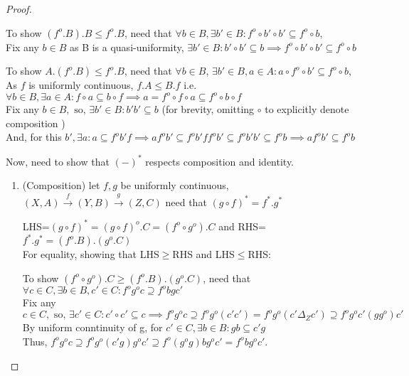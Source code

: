 \documentclass[18pt,a4paper]{article}
\theoremstyle{definition}
\begin{document}
\begin{proof}
\begin{enumerate}[label=(\roman*)]
	\end{enumerate}
\item	To show $(f^o .B).B \leq f^o .B$, need that $\forall b \in B,
	\exists b' \in B : f^o \circ b' \circ b' \subseteq f^o \circ b$,\\
	Fix any $b \in B$ as B is a quasi-uniformity, $\exists b' \in B : b' \circ b' \subseteq b
	\implies f^o \circ b'\circ b' \subseteq f^o \circ b$

	To show $A.(f^o .B) \leq f^o .B$, need that $\forall b \in B$,
	$\exists b' \in B, a\in A : a \circ f^o \circ b' \subseteq f^o \circ b$,\\
	As $f$ is uniformly continuous, $f.A\leq B.f$ i.e. $\forall b \in B, \exists a \in A
	: f \circ a \subseteq b \circ f
	\implies a= f^o \circ f \circ a \subseteq f^o \circ  b \circ f $   \\
	Fix any $b \in B, \text{ so, } \exists b' \in B : b'b' \subseteq b$
	(for brevity, omitting $\circ$ to explicitly denote composition  )\\
	And, for this $b', \exists a : a \subseteq f^ob'f \implies af^ob' \subseteq f^ob'ff^ob'
	\subseteq f^o b'b' \subseteq f^o b \implies af^ob' \subseteq f^o b$\\
\item	Now, need to show that $(-)^*$ respects composition and identity.
	\begin{enumerate}[label=(\roman*)]
		\item (Composition) let $f,g$ be uniformly continuous,
			$(X,A) \xrightarrow{f} (Y,B) \xrightarrow{g} (Z,C)$
			need that $(g \circ f)^*= f^*.g^* $

			LHS=$(g \circ f)^*=(g \circ f)^o .C=(f^o \circ g^o).C$ and
			RHS=$f^*.g^* =(f^o .B).(g^o .C)$\\
			For equality, showing that LHS$\geq$RHS and LHS$\leq$RHS:

			To show $(f^o \circ g^o).C\geq(f^o .B).(g^o .C)$, need that
			$\forall c \in C, \exists b \in B, c' \in C : f^og^oc
			\supseteq f^obgc'$ \\
			Fix any $c \in C, \text{ so, } \exists c' \in C: c' \circ c' \subseteq c
			\implies f^o g^o c \supseteq f^o g^o (c'c')
			=f^o g^o (c' \Delta_Z c') \supseteq f^o g^o c'(gg^o)c'$ \\
			By uniform conntinuity of g, for $c'\in C,\exists b\in B: gb\subseteq c'g $
			\\Thus, $f^o g^o c \supseteq f^o g^o (c'g)g^oc' \supseteq
			f^o (g^o g)bg^o c'=f^o bg^o c'$.


\end{enumerate}
\end{proof}
\end{document}
